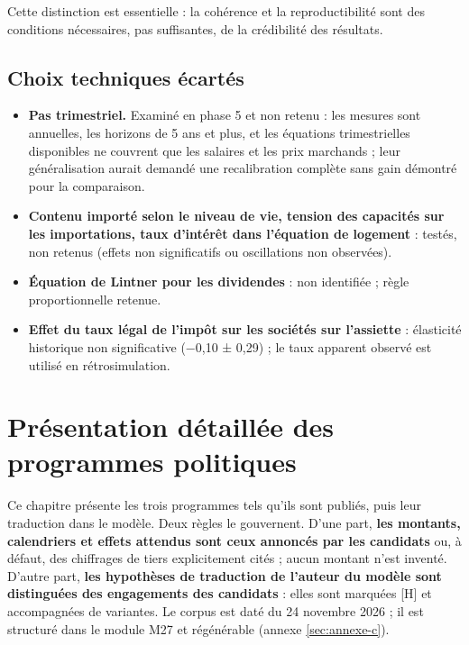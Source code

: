 \documentclass[
  11pt,
  11pt,
  a4paper,
  openany]{book}
\providecommand{\tightlist}{%
  \setlength{\itemsep}{0pt}\setlength{\parskip}{0pt}}
\begin{document}
Cette distinction est essentielle : la cohérence et la reproductibilité
sont des conditions nécessaires, pas suffisantes, de la crédibilité des
résultats.

\hypertarget{sec:ecartes}{%
\section{Choix techniques écartés}\label{sec:ecartes}}

\begin{itemize}
\tightlist
\item
  \textbf{Pas trimestriel.} Examiné en phase 5 et non retenu : les
  mesures sont annuelles, les horizons de 5 ans et plus, et les
  équations trimestrielles disponibles ne couvrent que les salaires et
  les prix marchands ; leur généralisation aurait demandé une
  recalibration complète sans gain démontré pour la comparaison.
\item
  \textbf{Contenu importé selon le niveau de vie, tension des capacités
  sur les importations, taux d'intérêt dans l'équation de logement} :
  testés, non retenus (effets non significatifs ou oscillations non
  observées).
\item
  \textbf{Équation de Lintner pour les dividendes} : non identifiée ;
  règle proportionnelle retenue.
\item
  \textbf{Effet du taux légal de l'impôt sur les sociétés sur
  l'assiette} : élasticité historique non significative (−0,10 ± 0,29) ;
  le taux apparent observé est utilisé en rétrosimulation.
\end{itemize}

\hypertarget{sec:programmes}{%
\chapter{Présentation détaillée des programmes
politiques}\label{sec:programmes}}

Ce chapitre présente les trois programmes tels qu'ils sont publiés, puis
leur traduction dans le modèle. Deux règles le gouvernent. D'une part,
\textbf{les montants, calendriers et effets attendus sont ceux annoncés
par les candidats} ou, à défaut, des chiffrages de tiers explicitement
cités ; aucun montant n'est inventé. D'autre part, \textbf{les
hypothèses de traduction de l'auteur du modèle sont distinguées des
engagements des candidats} : elles sont marquées {[}H{]} et accompagnées
de variantes. Le corpus est daté du 24 novembre 2026 ; il est structuré
dans le module M27 et régénérable (annexe \ref{sec:annexe-c}).
\end{document}
